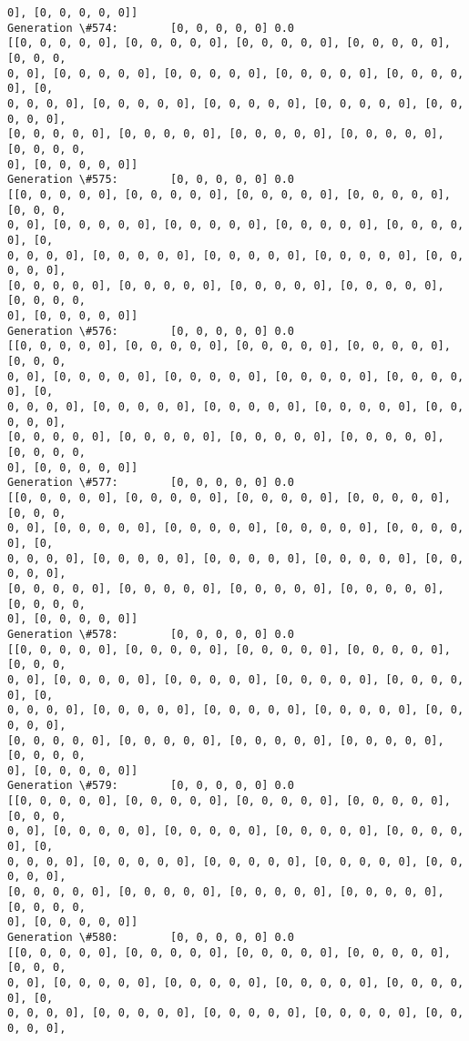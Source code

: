 \documentclass[11pt]{article}
\begin{document}
\begin{Verbatim}[commandchars=\\\{\}]
0], [0, 0, 0, 0, 0]]
Generation \#574:        [0, 0, 0, 0, 0] 0.0
[[0, 0, 0, 0, 0], [0, 0, 0, 0, 0], [0, 0, 0, 0, 0], [0, 0, 0, 0, 0], [0, 0, 0,
0, 0], [0, 0, 0, 0, 0], [0, 0, 0, 0, 0], [0, 0, 0, 0, 0], [0, 0, 0, 0, 0], [0,
0, 0, 0, 0], [0, 0, 0, 0, 0], [0, 0, 0, 0, 0], [0, 0, 0, 0, 0], [0, 0, 0, 0, 0],
[0, 0, 0, 0, 0], [0, 0, 0, 0, 0], [0, 0, 0, 0, 0], [0, 0, 0, 0, 0], [0, 0, 0, 0,
0], [0, 0, 0, 0, 0]]
Generation \#575:        [0, 0, 0, 0, 0] 0.0
[[0, 0, 0, 0, 0], [0, 0, 0, 0, 0], [0, 0, 0, 0, 0], [0, 0, 0, 0, 0], [0, 0, 0,
0, 0], [0, 0, 0, 0, 0], [0, 0, 0, 0, 0], [0, 0, 0, 0, 0], [0, 0, 0, 0, 0], [0,
0, 0, 0, 0], [0, 0, 0, 0, 0], [0, 0, 0, 0, 0], [0, 0, 0, 0, 0], [0, 0, 0, 0, 0],
[0, 0, 0, 0, 0], [0, 0, 0, 0, 0], [0, 0, 0, 0, 0], [0, 0, 0, 0, 0], [0, 0, 0, 0,
0], [0, 0, 0, 0, 0]]
Generation \#576:        [0, 0, 0, 0, 0] 0.0
[[0, 0, 0, 0, 0], [0, 0, 0, 0, 0], [0, 0, 0, 0, 0], [0, 0, 0, 0, 0], [0, 0, 0,
0, 0], [0, 0, 0, 0, 0], [0, 0, 0, 0, 0], [0, 0, 0, 0, 0], [0, 0, 0, 0, 0], [0,
0, 0, 0, 0], [0, 0, 0, 0, 0], [0, 0, 0, 0, 0], [0, 0, 0, 0, 0], [0, 0, 0, 0, 0],
[0, 0, 0, 0, 0], [0, 0, 0, 0, 0], [0, 0, 0, 0, 0], [0, 0, 0, 0, 0], [0, 0, 0, 0,
0], [0, 0, 0, 0, 0]]
Generation \#577:        [0, 0, 0, 0, 0] 0.0
[[0, 0, 0, 0, 0], [0, 0, 0, 0, 0], [0, 0, 0, 0, 0], [0, 0, 0, 0, 0], [0, 0, 0,
0, 0], [0, 0, 0, 0, 0], [0, 0, 0, 0, 0], [0, 0, 0, 0, 0], [0, 0, 0, 0, 0], [0,
0, 0, 0, 0], [0, 0, 0, 0, 0], [0, 0, 0, 0, 0], [0, 0, 0, 0, 0], [0, 0, 0, 0, 0],
[0, 0, 0, 0, 0], [0, 0, 0, 0, 0], [0, 0, 0, 0, 0], [0, 0, 0, 0, 0], [0, 0, 0, 0,
0], [0, 0, 0, 0, 0]]
Generation \#578:        [0, 0, 0, 0, 0] 0.0
[[0, 0, 0, 0, 0], [0, 0, 0, 0, 0], [0, 0, 0, 0, 0], [0, 0, 0, 0, 0], [0, 0, 0,
0, 0], [0, 0, 0, 0, 0], [0, 0, 0, 0, 0], [0, 0, 0, 0, 0], [0, 0, 0, 0, 0], [0,
0, 0, 0, 0], [0, 0, 0, 0, 0], [0, 0, 0, 0, 0], [0, 0, 0, 0, 0], [0, 0, 0, 0, 0],
[0, 0, 0, 0, 0], [0, 0, 0, 0, 0], [0, 0, 0, 0, 0], [0, 0, 0, 0, 0], [0, 0, 0, 0,
0], [0, 0, 0, 0, 0]]
Generation \#579:        [0, 0, 0, 0, 0] 0.0
[[0, 0, 0, 0, 0], [0, 0, 0, 0, 0], [0, 0, 0, 0, 0], [0, 0, 0, 0, 0], [0, 0, 0,
0, 0], [0, 0, 0, 0, 0], [0, 0, 0, 0, 0], [0, 0, 0, 0, 0], [0, 0, 0, 0, 0], [0,
0, 0, 0, 0], [0, 0, 0, 0, 0], [0, 0, 0, 0, 0], [0, 0, 0, 0, 0], [0, 0, 0, 0, 0],
[0, 0, 0, 0, 0], [0, 0, 0, 0, 0], [0, 0, 0, 0, 0], [0, 0, 0, 0, 0], [0, 0, 0, 0,
0], [0, 0, 0, 0, 0]]
Generation \#580:        [0, 0, 0, 0, 0] 0.0
[[0, 0, 0, 0, 0], [0, 0, 0, 0, 0], [0, 0, 0, 0, 0], [0, 0, 0, 0, 0], [0, 0, 0,
0, 0], [0, 0, 0, 0, 0], [0, 0, 0, 0, 0], [0, 0, 0, 0, 0], [0, 0, 0, 0, 0], [0,
0, 0, 0, 0], [0, 0, 0, 0, 0], [0, 0, 0, 0, 0], [0, 0, 0, 0, 0], [0, 0, 0, 0, 0],

\end{Verbatim}
\end{document}
